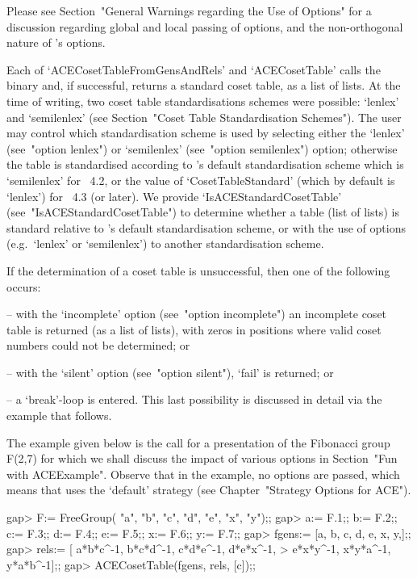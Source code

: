 Please see Section~"General Warnings regarding the Use of Options" for
a discussion regarding global and local passing of  options,  and  the
non-orthogonal nature of {\ACE}'s options.

Each of `ACECosetTableFromGensAndRels' and `ACECosetTable'  calls  the
{\ACE} binary and, if successful, returns a standard coset table, as a
{\GAP} list of  lists.  At  the  time  of  writing,  two  coset  table
standardisations schemes were possible: `lenlex' and `semilenlex' (see
Section~"Coset Table Standardisation Schemes"). The user  may  control
which standardisation scheme is used by selecting either the  `lenlex'
(see~"option  lenlex")  or  `semilenlex'   (see~"option   semilenlex")
option; otherwise the table  is  standardised  according  to  {\GAP}'s
default standardisation scheme which is `semilenlex'  for  {\GAP}~4.2,
or the value of `CosetTableStandard' (which by  default  is  `lenlex')
for  {\GAP}~4.3  (or  later).  We  provide   `IsACEStandardCosetTable'
(see~"IsACEStandardCosetTable") to determine whether a table (list  of
lists)  is  standard  relative  to  {\GAP}'s  default  standardisation
scheme, or with the use of options (e.g.~`lenlex' or `semilenlex')  to
another standardisation scheme.

If the determination of a coset table is unsuccessful, then one of the
following occurs:

\beginlist%

\item{--} with the `incomplete' option  (see~"option  incomplete")  an
incomplete coset table is returned (as a list of lists), with zeros in
positions where valid coset numbers could not be determined; or

\item{--} with the `silent' option (see~"option  silent"),  `fail'  is
returned; or

\item{--} a  `break'-loop  is  entered.  This  last   possibility   is
discussed in detail via the example that follows.

\endlist

The example given  below  is  the  call  for  a  presentation  of  the
Fibonacci group F(2,7) for  which  we  shall  discuss  the  impact  of
various options in Section~"Fun with ACEExample". Observe that in  the
example, no options are passed,  which  means  that  {\ACE}  uses  the
`default' strategy (see Chapter~"Strategy Options for ACE").

\beginexample
gap> F:= FreeGroup( "a", "b", "c", "d", "e", "x", "y");;
gap> a:= F.1;; b:= F.2;; c:= F.3;; d:= F.4;; e:= F.5;; x:= F.6;; y:= F.7;;
gap> fgens:= [a, b, c, d, e, x, y,];;
gap> rels:= [ a*b*c^-1, b*c*d^-1, c*d*e^-1, d*e*x^-1,
>             e*x*y^-1, x*y*a^-1, y*a*b^-1];;
gap> ACECosetTable(fgens, rels, [c]);;
\endexample

